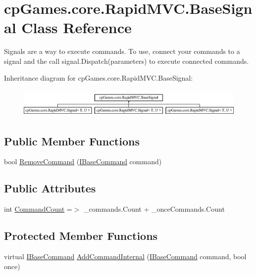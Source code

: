 \hypertarget{classcp_games_1_1core_1_1_rapid_m_v_c_1_1_base_signal}{}\section{cp\+Games.\+core.\+Rapid\+M\+V\+C.\+Base\+Signal Class Reference}
\label{classcp_games_1_1core_1_1_rapid_m_v_c_1_1_base_signal}


Signals are a way to execute commands. To use, connect your commands to a signal and the call signal.\+Dispatch(parameters) to execute connected commands.  


Inheritance diagram for cp\+Games.\+core.\+Rapid\+M\+V\+C.\+Base\+Signal\+:\begin{figure}[H]
\begin{center}
\leavevmode
\includegraphics[height=1.469816cm]{classcp_games_1_1core_1_1_rapid_m_v_c_1_1_base_signal}
\end{center}
\end{figure}
\subsection*{Public Member Functions}
\begin{DoxyCompactItemize}
\item 
bool \mbox{\hyperlink{classcp_games_1_1core_1_1_rapid_m_v_c_1_1_base_signal_a70a0c648b7fb80b54326178a8fb3e4a1}{Remove\+Command}} (\mbox{\hyperlink{interfacecp_games_1_1core_1_1_rapid_m_v_c_1_1_i_base_command}{I\+Base\+Command}} command)
\end{DoxyCompactItemize}
\subsection*{Public Attributes}
\begin{DoxyCompactItemize}
\item 
int \mbox{\hyperlink{classcp_games_1_1core_1_1_rapid_m_v_c_1_1_base_signal_a3f273a225810de09d155144a5e948257}{Command\+Count}} =$>$ \+\_\+commands.\+Count + \+\_\+once\+Commands.\+Count
\end{DoxyCompactItemize}
\subsection*{Protected Member Functions}
\begin{DoxyCompactItemize}
\item 
virtual \mbox{\hyperlink{interfacecp_games_1_1core_1_1_rapid_m_v_c_1_1_i_base_command}{I\+Base\+Command}} \mbox{\hyperlink{classcp_games_1_1core_1_1_rapid_m_v_c_1_1_base_signal_ab3899ea2a251c554f2b7ec3e6f4a9ed3}{Add\+Command\+Internal}} (\mbox{\hyperlink{interfacecp_games_1_1core_1_1_rapid_m_v_c_1_1_i_base_command}{I\+Base\+Command}} command, bool once)
\end{DoxyCompactItemize}
